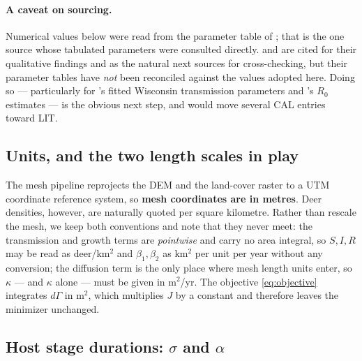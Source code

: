\documentclass[11pt]{article}
\newcommand{\tagLIT}{{\footnotesize\textsf{\textcolor{green!40!black}{LIT}}}}
\newcommand{\tagCAL}{{\footnotesize\textsf{\textcolor{orange!75!black}{CAL}}}}
\begin{document}
\paragraph{A caveat on sourcing.} Numerical values below were read from the parameter table of \citet{Almberg2011}; that is the one source whose tabulated parameters were consulted directly. \citet{Miller2006} and \citet{Wasserberg2009} are cited for their qualitative findings and as the natural next sources for cross-checking, but their parameter tables have \emph{not} been reconciled against the values adopted here. Doing so --- particularly for \citeauthor{Wasserberg2009}'s fitted Wisconsin transmission parameters and \citeauthor{Miller2006}'s $R_0$ estimates --- is the obvious next step, and would move several \tagCAL{} entries toward \tagLIT{}.

\subsection{Units, and the two length scales in play}
\label{sec:params-units}

The mesh pipeline reprojects the DEM and the land-cover raster to a UTM coordinate reference system, so \textbf{mesh coordinates are in metres}. Deer densities, however, are naturally quoted per square kilometre. Rather than rescale the mesh, we keep both conventions and note that they never meet: the transmission and growth terms are \emph{pointwise} and carry no area integral, so $S,I,R$ may be read as deer/km$^2$ and $\beta_1,\beta_2$ as km$^2$ per unit per year without any conversion; the diffusion term is the only place where mesh length units enter, so $\kappa$ --- and $\kappa$ alone --- must be given in m$^2$/yr. The objective \eqref{eq:objective} integrates $d\Gamma$ in m$^2$, which multiplies $J$ by a constant and therefore leaves the minimizer unchanged.

\subsection{Host stage durations: $\sigma$ and $\alpha$}
\end{document}
